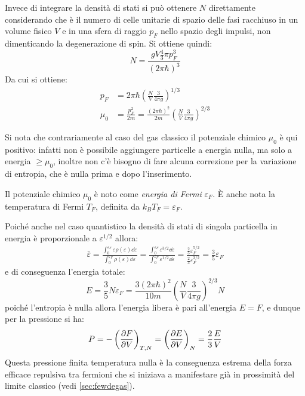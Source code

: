 Invece di integrare la densità di stati si può ottenere $N$ direttamente considerando che è il numero di celle unitarie di spazio delle fasi racchiuso in un volume fisico $V$ e in una sfera di raggio $p_F$ nello spazio degli impulsi, non dimenticando la degenerazione di spin. Si ottiene quindi:
\begin{equation*}
N = \frac{gV \frac{4}{3} \pi p_F^3}{(2\pi \hbar)^3}
\end{equation*}
Da cui si ottiene:
\begin{align*}
p_F &= 2\pi \hbar \left(\frac{N}{V} \frac{3}{4\pi g}\right)^{1/3}\\
\mu_0 &= \frac{p_F^2}{2m} = \frac{(2\pi \hbar)^2}{2m} \left(\frac{N}{V} \frac{3}{4\pi g}\right)^{2/3}
\end{align*}

Si nota che contrariamente al caso del gas classico il potenziale chimico $\mu_0$ è qui positivo: infatti non è possibile aggiungere particelle a energia nulla, ma solo a energia $\geq \mu_0$, inoltre non c'è bisogno di fare alcuna correzione per la variazione di entropia, che è nulla prima e dopo l'inserimento.

Il potenziale chimico $\mu_0$ è noto come \textit{energia di Fermi} $\varepsilon_F$. \`E anche nota la temperatura di Fermi $T_F$, definita da $k_B T_F = \varepsilon_F$.
\newline

Poiché anche nel caso quantistico la densità di stati di singola particella in energia è proporzionale a $\varepsilon^{1/2}$ allora:
\begin{align*}
	\bar{\varepsilon} = \frac{\int_{0}^{\varepsilon_F} \varepsilon \rho(\varepsilon) \dd \varepsilon}{\int_{0}^{\varepsilon_F} \rho(\varepsilon) \dd \varepsilon} = \frac{\int_{0}^{\varepsilon_F} \varepsilon^{3/2} \dd \varepsilon}{\int_{0}^{\varepsilon_F} \varepsilon^{1/2} \dd \varepsilon} = \frac{\frac{2}{5} \varepsilon_F^{5/2}}{\frac{2}{3} \varepsilon_F^{3/2}} = \frac{3}{5} \varepsilon_F
\end{align*}
e di conseguenza l'energia totale:
\begin{equation*}
E = \frac{3}{5} N \varepsilon_F = \frac{3(2\pi \hbar)^2}{10m} \left(\frac{N}{V} \frac{3}{4\pi g}\right)^{2/3} N
\end{equation*}
poiché l'entropia è nulla allora l'energia libera è pari all'energia $E=F$, e dunque per la pressione si ha:
\begin{equation}
P = - \left(\frac{\partial {F}}{\partial {V}}\right)_{T,N} =\left(\frac{\partial {E}}{\partial {V}}\right)_{N} = \frac{2}{3} \frac{E}{V}
\end{equation}
Questa pressione finita temperatura nulla è la conseguenza estrema della forza efficace repulsiva tra fermioni che si iniziava a manifestare già in prossimità del limite classico (vedi \cref{sec:fewdegas}).

